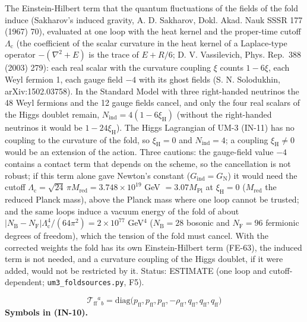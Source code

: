 \documentclass[
  10pt,
]{article}
\begin{document}
The Einstein-Hilbert term that the quantum fluctuations of the fields of
the fold induce (Sakharov's induced gravity, A. D. Sakharov, Dokl. Akad.
Nauk SSSR 177 (1967) 70), evaluated at one loop with the heat kernel and
the proper-time cutoff \(\Lambda_{\mathrm{c}}\) (the coefficient of the
scalar curvature in the heat kernel of a Laplace-type operator
\(-(\nabla^2 + E)\) is the trace of \(E + R/6\); D. V. Vassilevich,
Phys. Rep.~388 (2003) 279): each real scalar with the curvature coupling
\(\xi\) counts \(1 - 6\xi\), each Weyl fermion 1, each gauge field
\(-4\) with its ghost fields (S. N. Solodukhin, arXiv:1502.03758). In
the Standard Model with three right-handed neutrinos the 48 Weyl
fermions and the 12 gauge fields cancel, and only the four real scalars
of the Higgs doublet remain,
\(N_{\mathrm{ind}} = 4(1 - 6\xi_{\mathrm{H}})\) (without the
right-handed neutrinos it would be \(1 - 24\xi_{\mathrm{H}}\)). The
Higgs Lagrangian of UM-3 (IN-11) has no coupling to the curvature of the
fold, so \(\xi_{\mathrm{H}} = 0\) and \(N_{\mathrm{ind}} = 4\); a
coupling \(\xi_{\mathrm{H}} \ne 0\) would be an extension of the action.
Three cautions: the gauge-field value \(-4\) contains a contact term
that depends on the scheme, so the cancellation is not robust; if this
term alone gave Newton's constant
(\(G_{\mathrm{ind}} = G_{\mathrm{N}}\)) it would need the cutoff
\(\Lambda_{\mathrm{c}} = \sqrt{24}\,\pi M_{\mathrm{red}} = 3.748\times10^{19}\)
GeV \(= 3.07M_{\mathrm{Pl}}\) at \(\xi_{\mathrm{H}} = 0\)
(\(M_{\mathrm{red}}\) the reduced Planck mass), above the Planck mass
where one loop cannot be trusted; and the same loops induce a vacuum
energy of the fold of about
\(\lvert N_{\mathrm{B}} - N_{\mathrm{F}}\rvert\Lambda_{\mathrm{c}}^4/(64\pi^2) = 2\times10^{77}\)
GeV\(^4\) (\(N_{\mathrm{B}} = 28\) bosonic and \(N_{\mathrm{F}} = 96\)
fermionic degrees of freedom), which the tension of the fold must
cancel. With the corrected weights the fold has its own Einstein-Hilbert
term (FE-63), the induced term is not needed, and a curvature coupling
of the Higgs doublet, if it were added, would not be restricted by it.
Status: ESTIMATE (one loop and cutoff-dependent;
\texttt{um3\_foldsources.py}, F5).

\[
\mathcal{T}_{\mathrm{ff}}{}^a{}_b = \mathrm{diag}\big(p_{\mathrm{ff}}, p_{\mathrm{ff}}, p_{\mathrm{ff}}, -\rho_{\mathrm{ff}},
 q_{\mathrm{ff}}, q_{\mathrm{ff}}, q_{\mathrm{ff}}\big) \tag{IN-10}
\] \textbf{Symbols in (IN-10).}
\end{document}
